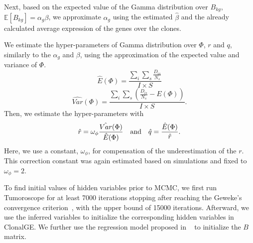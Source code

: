 \documentclass[unnumsec,webpdf,contemporary,large]{oup-authoring-template}%
\theoremstyle{thmstyleone}%
\theoremstyle{thmstyletwo}%
\theoremstyle{thmstylethree}%
\begin{document}
\begin{methods}
Next, based on the expected value of the Gamma distribution over $B_{kg}$, $\mathbb{E}[B_{kg}] = \alpha_g\beta$, 
we approximate $\alpha_g$ using the estimated $\hat{\beta}$ and the already calculated average expression of the genes over the clones. 

We estimate the hyper-parameters of Gamma distribution over $\Phi$, $r$ and $q$, similarly to the $\alpha_g$ and $\beta$, using the approximation of the expected value and variance of $\Phi$. 
$$\hat{E}(\Phi) = \frac{\sum_{i}\sum_{s}\frac{D_{is}}{N_s}}{I\times S} $$
$$\hat{Var}(\Phi) =\frac{\sum_{i}\sum_{s}(\frac{D_{is}}{N_s}-E(\Phi))}{I\times S}.$$
Then, we estimate the hyper-parameters with $$\hat{r} = \omega_{\phi}\frac{\hat{Var}(\Phi)}{\hat{E}(\Phi)} \text{\quad and\quad} \hat{q} = \frac{\hat{E}(\Phi)}{\hat{r}}.$$
Here, we use a constant, $\omega_{\phi}$, for compensation of the underestimation of the $r$. This correction constant was again estimated based on simulations and fixed to $\omega_{\phi}=2$.


 To find initial values of hidden variables prior to MCMC, we first run Tumoroscope for at least 7000 iterations stopping after reaching the Geweke's convergence criterion~\citep{geweke1991evaluating}, with the upper bound of 15000 iterations. Afterward, we use the inferred variables to initialize the corresponding hidden variables in ClonalGE. We further use the regression model proposed in ~\cite{shafighi2024integrative} to initialize the $B$ matrix.
 

\end{methods}
\end{document}
